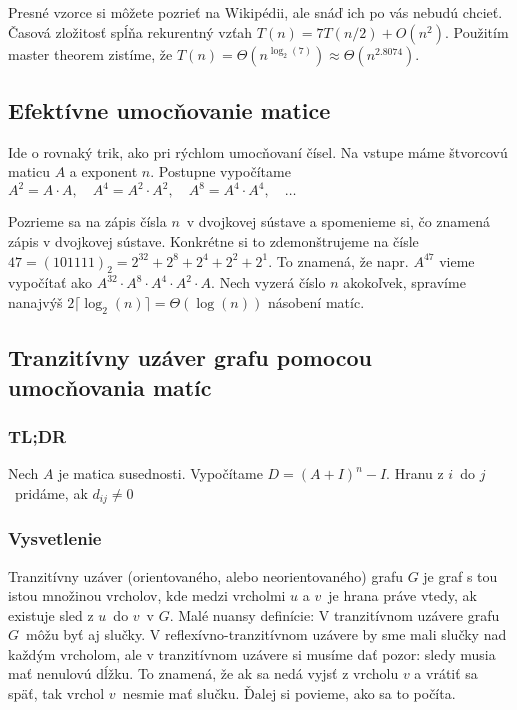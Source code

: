         Presné vzorce si môžete pozrieť na Wikipédii, ale snáď ich po vás nebudú chcieť. Časová zložitosť spĺňa rekurentný
        vzťah $T(n) = 7T(n/2) + O(n^2)$. Použitím master theorem zistíme, že $T(n) = \Theta(n^{\log_2(7)}) \approx \Theta(n^{2.8074})$.

	\subsection{Efektívne umocňovanie matice}

        Ide o rovnaký trik, ako pri rýchlom umocňovaní čísel. Na vstupe máme štvorcovú maticu $A$ a exponent $n$.
        Postupne vypočítame $A^2 = A \cdot A,\quad A^4 = A^2 \cdot A^2,\quad A^8 = A^4 \cdot A^4,\quad \ldots$

        Pozrieme sa na zápis čísla $n$ v dvojkovej sústave a spomenieme si, čo znamená zápis v dvojkovej sústave. Konkrétne
        si to zdemonštrujeme na čísle $47 = (101111)_2 = 2^{32} + 2^{8} + 2^{4} + 2^{2} + 2^1$. To znamená, že napr.
        $A^{47}$ vieme vypočítať ako $A^{32} \cdot A^{8} \cdot A^{4} \cdot A^{2} \cdot A$. Nech vyzerá číslo $n$
        akokoľvek, spravíme nanajvýš $2 \lceil \log_2(n) \rceil = \Theta(\log(n))$ násobení matíc.
        
	\subsection{Tranzitívny uzáver grafu pomocou umocňovania matíc}

        \subsubsection{TL;DR}
        Nech $A$ je matica susednosti. Vypočítame $D = (A + I)^n - I$. Hranu z $i$ do $j$ pridáme,
        ak $d_{ij} \neq 0$

        \subsubsection{Vysvetlenie}
        Tranzitívny uzáver (orientovaného, alebo neorientovaného) grafu $G$ je graf s tou istou množinou vrcholov,
        kde medzi vrcholmi $u$ a $v$ je hrana práve vtedy, ak existuje sled z $u$ do $v$ v $G$. Malé nuansy definície:
        V tranzitívnom uzávere grafu $G$ môžu byť aj slučky. V reflexívno-tranzitívnom uzávere by sme mali slučky nad
        každým vrcholom, ale v tranzitívnom uzávere si musíme dať pozor: sledy musia mať nenulovú dĺžku. To znamená, že
        ak sa nedá vyjsť z vrcholu $v$ a vrátiť sa späť, tak vrchol $v$ nesmie mať slučku. Ďalej si povieme,
        ako sa to počíta.

